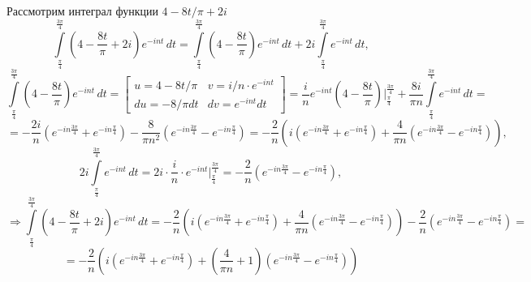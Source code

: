 \documentclass[a4paper, 16pt]{article}
\begin{document}
\noindent Рассмотрим интеграл функции $4-8t/\pi+2i$
$$
\int\limits_{\frac{\pi}{4}}^{\frac{3\pi}{4}}\left(4-\dfrac{8t}{\pi}+2i\right)e^{-int}\,dt=
\int\limits_{\frac{\pi}{4}}^{\frac{3\pi}{4}}\left(4-\dfrac{8t}{\pi}\right)e^{-int}\,dt+2i\int\limits_{\frac{\pi}{4}}^{\frac{3\pi}{4}}e^{-int}\,dt,
$$
$$
\int\limits_{\frac{\pi}{4}}^{\frac{3\pi}{4}}\left(4-\dfrac{8t}{\pi}\right)e^{-int}\,dt=\begin{bmatrix}
    u=4-8t/\pi & v=i/n\cdot e^{-int}\\
    du=-8/\pi dt & dv=e^{-int}dt
\end{bmatrix}=
\dfrac{i}{n}e^{-int}\left(4-\dfrac{8t}{\pi}\right)\bigg|_{\frac{\pi}{4}}^{\frac{3\pi}{4}}+\dfrac{8i}{\pi n}\int\limits_{\frac{\pi}{4}}^{\frac{3\pi}{4}}e^{-int}\,dt=
$$
$$
=-\dfrac{2i}{n}\left(e^{-in\frac{3\pi}{4}}+e^{-in\frac{\pi}{4}}\right)-\dfrac{8}{\pi n^2}\left(e^{-in\frac{3\pi}{4}}-e^{-in\frac{\pi}{4}}\right)=
-\dfrac{2}{n}\left(i\left(e^{-in\frac{3\pi}{4}}+e^{-in\frac{\pi}{4}}\right)+\dfrac{4}{\pi n}\left(e^{-in\frac{3\pi}{4}}-e^{-in\frac{\pi}{4}}\right)\right),
$$
$$
2i\int\limits_{\frac{\pi}{4}}^{\frac{3\pi}{4}}e^{-int}\,dt=2i\cdot\dfrac{i}{n}\cdot e^{-int}\bigg|_{\frac{\pi}{4}}^{\frac{3\pi}{4}}=-\dfrac{2}{n}\left(e^{-in\frac{3\pi}{4}}-e^{-in\frac{\pi}{4}}\right),
$$
$$
\Rightarrow\int\limits_{\frac{\pi}{4}}^{\frac{3\pi}{4}}\left(4-\dfrac{8t}{\pi}+2i\right)e^{-int}\,dt=-\dfrac{2}{n}\left(i\left(e^{-in\frac{3\pi}{4}}+e^{-in\frac{\pi}{4}}\right)+\dfrac{4}{\pi n}\left(e^{-in\frac{3\pi}{4}}-e^{-in\frac{\pi}{4}}\right)\right)-\dfrac{2}{n}\left(e^{-in\frac{3\pi}{4}}-e^{-in\frac{\pi}{4}}\right)=
$$
$$
=-\dfrac{2}{n}\left(i\left(e^{-in\frac{3\pi}{4}}+e^{-in\frac{\pi}{4}}\right)+\left(\dfrac{4}{\pi n}+1\right)\left(e^{-in\frac{3\pi}{4}}-e^{-in\frac{\pi}{4}}\right)\right)
$$
\end{document}
